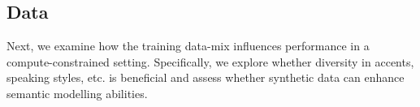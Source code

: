 \subsection{Data}
Next, we examine how the training data-mix influences performance in a compute-constrained setting. Specifically, we explore whether diversity in accents, speaking styles, etc. is beneficial and assess whether synthetic data can enhance semantic modelling abilities.

\begin{table}[t!]
  \centering
  \caption{Analysing impact of training data diversity and synthetic data on \slm performance. The default \method recipe does not use diverse data (only Libri-light and LibriSpeech), but uses the synthetic sTinyStories data.}
  \label{tab:data_analysis}
\end{table}

